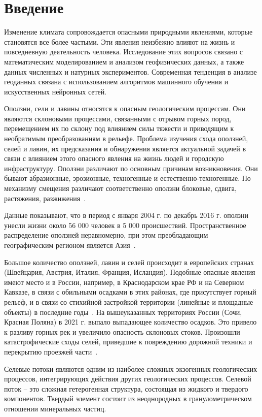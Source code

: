 \documentclass[mathematics,article,accept,pdftex,moreauthors]{Definitions/mdpi}
\begin{document}
\section{Введение}

Изменение климата сопровождается опасными природными явлениями, которые становятся все более частыми. Эти явления неизбежно влияют на жизнь и повседневную деятельность человека. Исследование этих вопросов связано с математическим моделированием и анализом геофизических данных, а также данных численных и натурных экспериментов. Современная тенденция в анализе геоданных связана с использованием алгоритмов машинного обучения и искусственных нейронных сетей.

Оползни, сели и лавины относятся к опасным геологическим процессам. Они являются склоновыми процессами, связанными с отрывом горных пород, перемещением их по склону под влиянием силы тяжести и приводящим к необратимым преобразованиям в рельефе. Проблема изучения схода оползней, селей и лавин, их предсказания и обнаружения является актуальной задачей в связи с влиянием этого опасного явления на жизнь людей и городскую инфраструктуру. Оползни различают по основным причинам возникновения. Они бывают абразионные, эрозионные, техногенные и естественно-техногенные. По механизму смещения различают соответственно оползни блоковые, сдвига, растяжения, разжижения~\cite{Pendin2015}.

Данные показывают, что в период с января 2004 г. по декабрь 2016 г. оползни унесли жизни около 56 000 человек в 5 000 происшествий. Пространственное распределение оползней неравномерно, при этом преобладающим географическим регионом является Азия~\cite{Froude2018}.

Большое количество оползней, лавин и селей происходит в европейских странах (Швейцария, Австрия, Италия, Франция, Исландия). Подобные опасные явления имеют место и в России, например, в Краснодарском крае РФ и на Северном Кавказе, в связи с обильными осадками в этих районах, где присутствует горный рельеф, и в связи со стихийной застройкой территории (линейные и площадные объекты) в последние годы~\cite{hungr2005landslide}. На вышеуказанных территориях России (Сочи, Красная Поляна) в 2021 г. выпало выпадающее количество осадков. Это привело к разливу горных рек и увеличило опасность склоновых стоков. Произошли катастрофические сходы селей, приведшие к повреждению дорожной техники и перекрытию проезжей части~\cite{Harch2020}.

Селевые потоки являются одним из наиболее сложных экзогенных геологических процессов, интегрирующих действия других геологических процессов. Селевой поток -- это сложная гетерогенная структура, состоящая из жидкого и твердого компонентов. Твердый элемент состоит из неоднородных в гранулометрическом отношении минеральных частиц.
\end{document}
